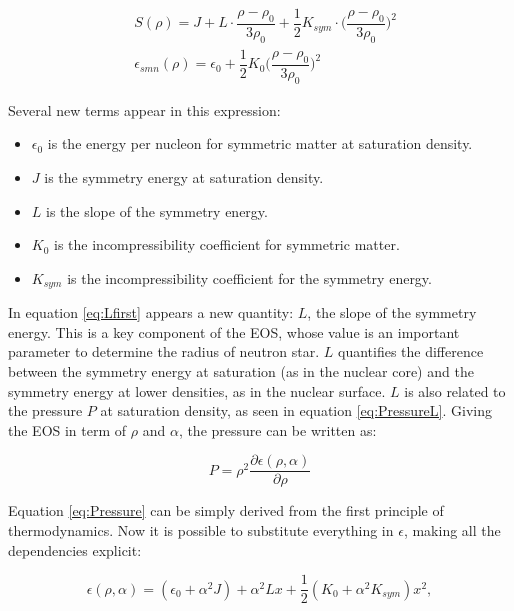 \begin{equation} \label{eq:Lfirst}
\begin{split}
& S(\rho) = J + L \cdot \dfrac{\rho - \rho_{0}}{3 \rho_{0}} + \dfrac{1}{2} K_{sym} \cdot \biggl(\dfrac{\rho - \rho_{0}}{3 \rho_{0}}\biggl)^{2} \\
& \epsilon _{smn} (\rho) = \epsilon_{0} + \dfrac{1}{2}K_{0} \biggl(\dfrac{\rho - \rho_{0}}{3 \rho_{0}} \biggl)^{2} 
\end{split}
\end{equation}

Several new terms appear in this expression:
\begin{itemize}
\item $\epsilon_{0}$ is the energy per nucleon for symmetric matter at saturation density.
\item $J$ is the symmetry energy at saturation density.
\item $L$ is the slope of the symmetry energy.
\item $K_{0}$ is the incompressibility coefficient for symmetric matter. 
\item $K_{sym}$ is the incompressibility coefficient for the symmetry energy.
\end{itemize}

In equation \ref{eq:Lfirst} appears a new quantity: $L$, the slope of the symmetry energy. This is a key component of the EOS, whose value is an important parameter to determine the radius of neutron star. $L$ quantifies the difference between the symmetry energy at saturation (as in the nuclear core) and the symmetry energy at lower densities, as in the nuclear surface. $L$ is also related to the pressure $P$ at saturation density, as seen in equation \ref{eq:PressureL}. Giving the EOS in term of $\rho$ and $\alpha$, the pressure can be written as:

\begin{equation} \label{eq:Pressure}
P = \rho^{2} \dfrac{\partial \epsilon(\rho, \alpha)}{\partial \rho}
\end{equation} 

Equation \ref{eq:Pressure} can be simply derived from the first principle of thermodynamics. Now it is possible to substitute everything in $\epsilon$, making all the dependencies explicit:

\begin{equation}
\epsilon (\rho, \alpha) = (\epsilon_{0} + \alpha^{2} J) + \alpha^{2}Lx + \frac{1}{2} (K_{0} + \alpha^{2}K_{sym})x^{2} ,
\end{equation}

